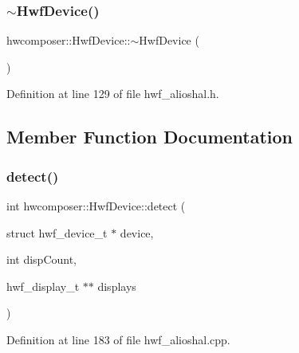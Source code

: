 \subsubsection{\texorpdfstring{$\sim$\+Hwf\+Device()}{~HwfDevice()}}
{\footnotesize\ttfamily hwcomposer\+::\+Hwf\+Device\+::$\sim$\+Hwf\+Device (\begin{DoxyParamCaption}{ }\end{DoxyParamCaption})\hspace{0.3cm}{\ttfamily [inline]}}



Definition at line 129 of file hwf\+\_\+alioshal.\+h.


\begin{DoxyCode}{0}
\end{DoxyCode}


\subsection{Member Function Documentation}
\mbox{\label{structhwcomposer_1_1HwfDevice_a5bd285f65735f896968db942ca18f22b}} 
\subsubsection{\texorpdfstring{detect()}{detect()}}
{\footnotesize\ttfamily int hwcomposer\+::\+Hwf\+Device\+::detect (\begin{DoxyParamCaption}\item[{struct hwf\+\_\+device\+\_\+t $\ast$}]{device,  }\item[{int}]{disp\+Count,  }\item[{hwf\+\_\+display\+\_\+t $\ast$$\ast$}]{displays }\end{DoxyParamCaption})\hspace{0.3cm}{\ttfamily [static]}}



Definition at line 183 of file hwf\+\_\+alioshal.\+cpp.


